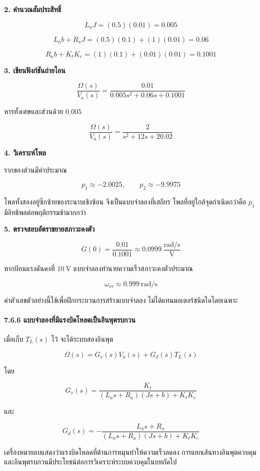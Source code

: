 \textbf{2. คำนวณสัมประสิทธิ์}

\[
L_aJ=(0.5)(0.01)=0.005
\]

\[
L_ab+R_aJ=(0.5)(0.1)+(1)(0.01)=0.06
\]

\[
R_ab+K_tK_e=(1)(0.1)+(0.01)(0.01)=0.1001
\]

\textbf{3. เขียนฟังก์ชันถ่ายโอน}

\[
\boxed{
\frac{\Omega(s)}{V_a(s)}
=
\frac{0.01}{0.005s^2+0.06s+0.1001}
}
\]

หารทั้งเศษและส่วนด้วย $0.005$

\[
\boxed{
\frac{\Omega(s)}{V_a(s)}
=
\frac{2}{s^2+12s+20.02}
}
\]

\textbf{4. วิเคราะห์โพล}

รากของส่วนมีค่าประมาณ

\[
p_1\approx-2.0025,\qquad
p_2\approx-9.9975
\]

โพลทั้งสองอยู่ซีกซ้ายของระนาบเชิงซ้อน จึงเป็นแบบจำลองที่เสถียร โพลที่อยู่ใกล้จุดกำเนิดกว่าคือ $p_1$ มีอิทธิพลต่อพฤติกรรมช้ามากกว่า

\textbf{5. ตรวจสอบอัตราขยายสภาวะคงตัว}

\[
G(0)=\frac{0.01}{0.1001}
\approx0.0999\ \frac{\text{rad/s}}{\text{V}}
\]

หากป้อนแรงดันคงที่ $10\ \text{V}$ แบบจำลองทำนายความเร็วสภาวะคงตัวประมาณ

\[
\omega_{ss}\approx0.999\ \text{rad/s}
\]

ค่าตัวเลขตัวอย่างนี้ใช้เพื่อฝึกกระบวนการสร้างแบบจำลอง ไม่ได้แทนมอเตอร์ชนิดใดโดยเฉพาะ

\paragraph{7.6.6 แบบจำลองที่มีแรงบิดโหลดเป็นอินพุตรบกวน}

เมื่อเก็บ $T_L(s)$ ไว้ จะได้ระบบสองอินพุต

\[
\Omega(s)
=
G_v(s)V_a(s)+G_d(s)T_L(s)
\]

โดย

\[
G_v(s)=
\frac{K_t}
{(L_as+R_a)(Js+b)+K_tK_e}
\]

และ

\[
G_d(s)=
-\frac{L_as+R_a}
{(L_as+R_a)(Js+b)+K_tK_e}
\]

เครื่องหมายลบแสดงว่าแรงบิดโหลดที่ต้านการหมุนทำให้ความเร็วลดลง การแยกเส้นทางอินพุตควบคุมและอินพุตรบกวนมีประโยชน์ต่อการวิเคราะห์ระบบควบคุมในบทถัดไป



